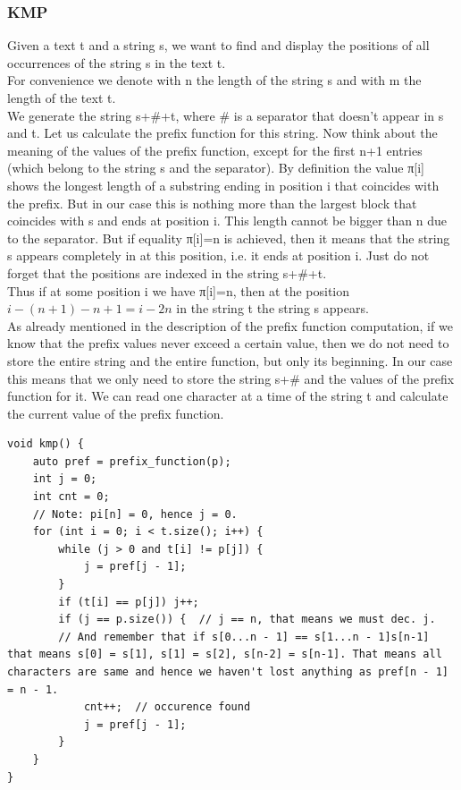 \documentclass[8pt, a4paper, oneside, twocolumn]{extarticle}
\begin{document}
\subsubsection{KMP}
Given a text t and a string s, we want to find and display the positions of all occurrences of the string s in the text t.
\\For convenience we denote with n the length of the string s and with m the length of the text t.\\
We generate the string s+\#+t, where \# is a separator that doesn't appear in s and t. Let us calculate the prefix function for this string. Now think about the meaning of the values of the prefix function, except for the first n+1 entries (which belong to the string s and the separator). By definition the value π[i] shows the longest length of a substring ending in position i that coincides with the prefix. But in our case this is nothing more than the largest block that coincides with s and ends at position i. This length cannot be bigger than n due to the separator. But if equality π[i]=n is achieved, then it means that the string s appears completely in at this position, i.e. it ends at position i. Just do not forget that the positions are indexed in the string s+\#+t.\\
Thus if at some position i we have π[i]=n, then at the position $i − (n + 1) − n + 1 = i − 2n$ in the string t the string s appears.\\
As already mentioned in the description of the prefix function computation, if we know that the prefix values never exceed a certain value, then we do not need to store the entire string and the entire function, but only its beginning. In our case this means that we only need to store the string s+\# and the values of the prefix function for it. We can read one character at a time of the string t and calculate the current value of the prefix function.
\begin{verbatim}
void kmp() {
    auto pref = prefix_function(p);
    int j = 0;
    int cnt = 0;
	// Note: pi[n] = 0, hence j = 0.
    for (int i = 0; i < t.size(); i++) {
        while (j > 0 and t[i] != p[j]) {
            j = pref[j - 1];
        }
        if (t[i] == p[j]) j++;
        if (j == p.size()) {  // j == n, that means we must dec. j. 
		// And remember that if s[0...n - 1] == s[1...n - 1]s[n-1] that means s[0] = s[1], s[1] = s[2], s[n-2] = s[n-1]. That means all characters are same and hence we haven't lost anything as pref[n - 1] = n - 1.
            cnt++;  // occurence found
            j = pref[j - 1];
        }
    }
}
\end{verbatim}
\end{document}
